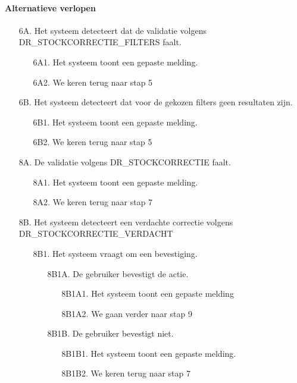     \paragraph{Alternatieve verlopen}
    \begin{itemize}[nosep]
        \item[6A.] Het systeem detecteert dat de validatie volgens DR\_STOCKCORRECTIE\_FILTERS faalt.
        \begin{itemize}
            \item[6A1.] Het systeem toont een gepaste melding.
            \item[6A2.] We keren terug naar stap 5
        \end{itemize}
        \item[6B.] Het systeem detecteert dat voor de gekozen filters geen resultaten zijn.
        \begin{itemize}
            \item[6B1.] Het systeem toont een gepaste melding.
            \item[6B2.] We keren terug naar stap 5
        \end{itemize}
        \item[8A.] De validatie volgens DR\_STOCKCORRECTIE faalt.
        \begin{itemize}
            \item[8A1.] Het systeem toont een gepaste melding.
            \item[8A2.] We keren terug naar stap 7
        \end{itemize}

        \item[8B.] Het systeem detecteert een verdachte correctie volgens DR\_STOCKCORRECTIE\_VERDACHT
        \begin{itemize}
            \item[8B1.] Het systeem vraagt om een bevestiging.
            \begin{itemize}
                \item[8B1A.] De gebruiker bevestigt de actie.
                \begin{itemize}
                    \item[8B1A1.] Het systeem toont een gepaste melding
                    \item[8B1A2.] We gaan verder naar stap 9
                \end{itemize}
                \item[8B1B.] De gebruiker bevestigt niet.
                \begin{itemize}
                    \item[8B1B1.] Het systeem toont een gepaste melding.
                    \item[8B1B2.] We keren terug naar stap 7
                \end{itemize}
            \end{itemize}
        \end{itemize}
    \end{itemize}

